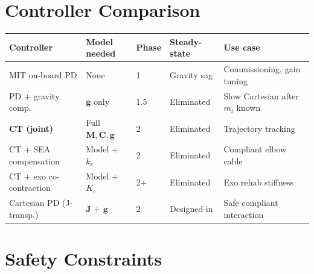 \documentclass[11pt,a4paper]{article}
\newcommand{\M}{\bm{M}}
\newcommand{\Cor}{\bm{C}}
\newcommand{\vg}{\bm{g}}
\newcommand{\J}{\bm{J}}
\newcommand{\ks}{k_{\mathrm{s}}}
\begin{document}
\section{Controller Comparison}
\label{sec:compare}

\begin{center}\small
\begin{tabular}{p{3.2cm} p{2.2cm} p{1.6cm} p{2.4cm} p{3.2cm}}
\toprule
\textbf{Controller} & \textbf{Model needed} & \textbf{Phase} & \textbf{Steady-state} & \textbf{Use case} \\
\midrule
MIT on-board PD          & None            & 1   & Gravity sag   & Commissioning, gain tuning \\
PD + gravity comp.       & $\vg$ only      & 1.5 & Eliminated    & Slow Cartesian after $m_i$ known \\
\textbf{CT (joint)}      & Full $\M,\Cor,\vg$ & 2 & Eliminated & Trajectory tracking \\
CT + SEA compensation    & Model + $\ks$   & 2   & Eliminated    & Compliant elbow cable \\
CT + exo co-contraction  & Model + $K_e$   & 2+  & Eliminated    & Exo rehab stiffness \\
Cartesian PD (J-transp.) & $\J$ + $\vg$   & 2   & Designed-in   & Safe compliant interaction \\
\bottomrule
\end{tabular}
\end{center}

\section{Safety Constraints}
\label{sec:safety}
\end{document}

